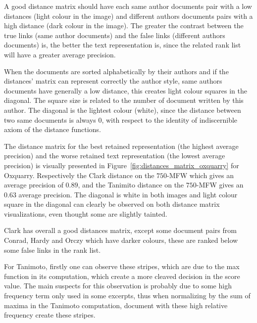 A good distance matrix should have each same author documents pair with a low distances (light colour in the image) and different authors documents pairs with a high distance (dark colour in the image).
The greater the contrast between the true links (same author documents) and the false links (different authors documents) is, the better the text representation is, since the related rank list will have a greater average precision.

When the documents are sorted alphabetically by their authors and if the distances' matrix can represent correctly the author style, same authors documents have generally a low distance, this creates light colour squares in the diagonal.
The square size is related to the number of document written by this author.
The diagonal is the lightest colour (white), since the distance between two same documents is always 0, with respect to the identity of indiscernible axiom of the distance functions.

The distance matrix for the best retained representation (the highest average precision) and the worse retained text representation (the lowest average precision) is visually presented in Figure~\ref{fig:distances_matrix_oxquarry} for Oxquarry.
Respectively the Clark distance on the $750$-MFW which gives an average precision of $0.89$, and the Tanimito distance on the $750$-MFW gives an $0.63$ average precision.
The diagonal is white in both images and light colour square in the diagonal can clearly be observed on both distance matrix visualizations, even thought some are slightly tainted.

Clark has overall a good distances matrix, except some document pairs from Conrad, Hardy and Orczy which have darker colours, these are ranked below some false links in the rank list.

For Tanimoto, firstly one can observe these stripes, which are due to the max function in its computation, which create a more cleaved decision in the score value.
The main suspects for this observation is probably due to some high frequency term only used in some excerpts, thus when normalizing by the sum of maxima in the Tanimoto computation, document with these high relative frequency create these stripes.

